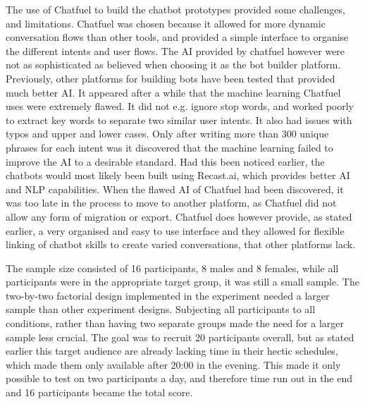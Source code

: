 The use of Chatfuel to build the chatbot prototypes provided some challenges, and limitations. Chatfuel was chosen because it allowed for more dynamic conversation flows than other tools, and provided a simple interface to organise the different intents and user flows. The AI provided by chatfuel however were not as sophisticated as believed when choosing it as the bot builder platform. Previously, other platforms for building bots have been tested that provided much better AI. It appeared after a while that the machine learning Chatfuel uses were extremely flawed. It did not e.g. ignore stop words, and worked poorly to extract key words to separate two similar user intents. It also had issues with typos and upper and lower cases. Only after writing more than 300 unique phrases for each intent was it discovered that the machine learning failed to improve the AI to a desirable standard. Had this been noticed earlier, the chatbots would most likely been built using Recast.ai, which provides better AI and NLP capabilities. When the flawed AI of Chatfuel had been discovered, it was too late in the process to move to another platform, as Chatfuel did not allow any form of migration or export. Chatfuel does however provide, as stated earlier, a very organised and easy to use interface and they allowed for flexible linking of chatbot skills to create varied conversations, that other platforms lack. 

The sample size consisted of 16 participants, 8 males and 8 females, while all participants were in the appropriate target group, it was still a small sample. The two-by-two factorial design implemented in the experiment needed a larger sample than other experiment designs. Subjecting all participants to all conditions, rather than having two separate groups made the need for a larger sample less crucial. The goal was to recruit 20 participants overall, but as stated earlier this target audience are already lacking time in their hectic schedules, which made them only available after 20:00 in the evening. This made it only possible to test on two participants a day, and therefore time run out in the end and 16 participants became the total score.
